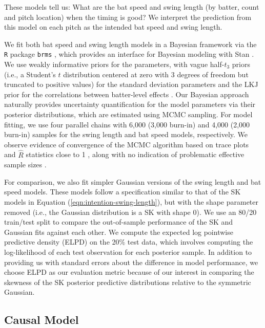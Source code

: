 \documentclass[
  12pt]{article}
\begin{document}
    These models tell us: What are the bat speed and swing length (by batter, count and pitch location) when the timing is good? We interpret the prediction from this model on each pitch as the intended bat speed and swing length.
    
    We fit both bat speed and swing length models in a Bayesian framework via the \texttt{R} package \texttt{brms} \citep{burkner_bayesian_2021}, which provides an interface for Bayesian modeling with Stan \citep{carpenter_stan_2017}. We use weakly informative priors for the parameters, with vague half-$t_3$ priors (i.e., a Student's $t$ distribution centered at zero with 3 degrees of freedom but truncated to positive values) for the standard deviation parameters \citep{gelman_prior_2006} and the LKJ prior for the correlations between batter-level effects \citep{lewandowski_generating_2009}. Our Bayesian approach naturally provides uncertainty quantification for the model parameters via their posterior distributions, which are estimated using MCMC sampling. For model fitting, we use four parallel chains with 6,000 (3,000 burn-in) and 4,000 (2,000 burn-in) samples for the swing length and bat speed models, respectively. We observe evidence of convergence of the MCMC algorithm based on trace plots and $\hat{R}$ statistics close to 1 \citep{gelman_inference_1992, brooks_general_1998}, along with no indication of problematic effective sample sizes \citep{gelman_bayesian_2020}.
    
    For comparison, we also fit simpler Gaussian versions of the swing length and bat speed models. These models follow a specification similar to that of the SK models in Equation (\ref{eqn:intention-swing-length}), but with the shape parameter removed (i.e., the Gaussian distribution is a SK with shape 0). We use an 80/20 train/test split to compare the out-of-sample performance of the SK and Gaussian fits against each other. We compute the expected log pointwise predictive density (ELPD) on the 20\% test data, which involves computing the log-likelihood of each test observation for each posterior sample. In addition to providing us with standard errors about the difference in model performance, we choose ELPD as our evaluation metric because of our interest in comparing the skewness of the SK posterior predictive distributions relative to the symmetric Gaussian.

    \subsection{Causal Model}
    \label{sec:methods-causal}
\end{document}
